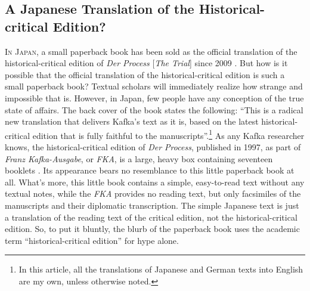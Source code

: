 \begin{paper}
\section{A Japanese Translation of the
Historical-critical Edition?}\label{a-japanese-translation-of-the-historical-critical-edition}

\textsc{In Japan}, a small paperback book has been sold as the official
translation of the historical-critical edition of \emph{Der Process}
{[}\emph{The Trial}{]} since 2009 \citep{kafka_sosho_2009}. But how is it possible
that the official translation of the historical-critical edition is such
a small paperback book? Textual scholars will immediately realize how
strange and impossible that is. However, in Japan, few people have any
conception of the true state of affairs. The back cover of the book
states the following: ``This is a radical new translation that delivers
Kafka's text as it is, based on the latest historical-critical edition
that is fully faithful to the manuscripts''.\footnote{In this article,
  all the translations of Japanese and German texts into English are my
  own, unless otherwise noted.} As any Kafka researcher knows, the
historical-critical edition of \emph{Der Process}, published in 1997,
as part of \emph{Franz Kafka-Ausgabe}, or \emph{FKA}, is a large,
heavy box containing seventeen booklets \citep{kafka_process_1997}. Its appearance
bears no resemblance to this little paperback book at all. What's more,
this little book contains a simple, easy-to-read text without any
textual notes, while the \emph{FKA} provides no reading text, but only
facsimiles of the manuscripts and their diplomatic transcription. The
simple Japanese text is just a translation of the reading text of the
critical edition, not the historical-critical edition. So, to put it
bluntly, the blurb of the paperback book uses the academic term
``historical-critical edition'' for hype alone.


\end{paper}
